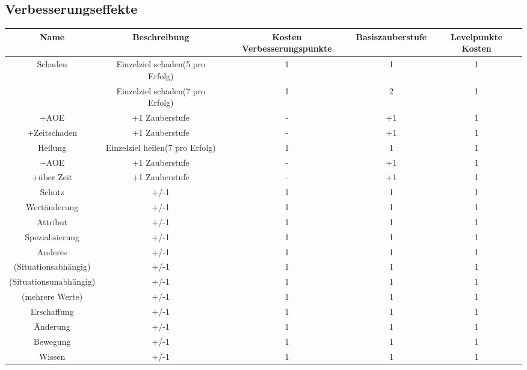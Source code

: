 \subsection{Verbesserungseffekte}
\begin{tabulary}{\textwidth}{|C|C|C|C|C|}
\hline 
Name & Beschreibung & Kosten Verbesserungspunkte & Basiszauberstufe & Levelpunkte Kosten \\ 
\hline 
Schaden & Einzelziel schaden(5 pro Erfolg) & 1 & 1 & 1 \\ 
 & Einzelziel schaden(7 pro Erfolg) & 1 & 2 & 1 \\ 
+AOE & +1 Zauberstufe & - & +1 & 1 \\ 
+Zeitschaden & +1 Zauberstufe & - & +1 & 1 \\ 
\hline 
Heilung & Einzelziel heilen(7 pro Erfolg) & 1 & 1 & 1 \\ 
+AOE & +1 Zauberstufe & - & +1 & 1 \\ 
+über Zeit & +1 Zauberstufe & - & +1 & 1 \\ 
\hline 
Schutz & +/-1 & 1 & 1 & 1 \\ 
\hline 
Wertänderung & +/-1 & 1 & 1 & 1 \\ 
Attribut & +/-1 & 1 & 1 & 1 \\ 
Spezialisierung & +/-1 & 1 & 1 & 1 \\ 
Anderes & +/-1 & 1 & 1 & 1 \\ 
(Situationsabhängig) & +/-1 & 1 & 1 & 1 \\ 
(Situationsunabhängig) & +/-1 & 1 & 1 & 1 \\ 
(mehrere Werte) & +/-1 & 1 & 1 & 1 \\ 
\hline 
Erschaffung & +/-1 & 1 & 1 & 1 \\ 
\hline 
Änderung & +/-1 & 1 & 1 & 1 \\ 
\hline
Bewegung & +/-1 & 1 & 1 & 1 \\ 
\hline 
Wissen & +/-1 & 1 & 1 & 1 \\ 
\hline 
\end{tabulary} 

